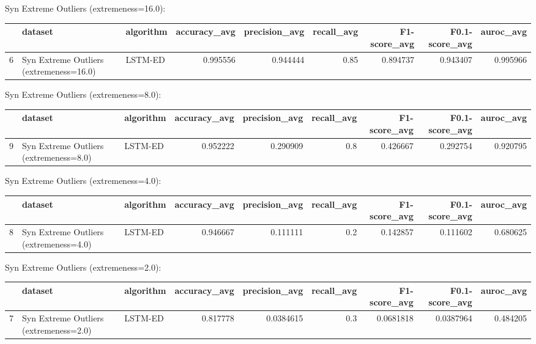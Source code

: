 Syn Extreme Outliers (extremeness=16.0):

\begin{tabular}{rllrrrrrr}
\hline
    & dataset                                 & algorithm   &   accuracy\_avg &   precision\_avg &   recall\_avg &   F1-score\_avg &   F0.1-score\_avg &   auroc\_avg \\
\hline
  6 & Syn Extreme Outliers (extremeness=16.0) & LSTM-ED     &       0.995556 &        0.944444 &         0.85 &       0.894737 &         0.943407 &    0.995966 \\
\hline
\end{tabular}

Syn Extreme Outliers (extremeness=8.0):

\begin{tabular}{rllrrrrrr}
\hline
    & dataset                                & algorithm   &   accuracy\_avg &   precision\_avg &   recall\_avg &   F1-score\_avg &   F0.1-score\_avg &   auroc\_avg \\
\hline
  9 & Syn Extreme Outliers (extremeness=8.0) & LSTM-ED     &       0.952222 &        0.290909 &          0.8 &       0.426667 &         0.292754 &    0.920795 \\
\hline
\end{tabular}

Syn Extreme Outliers (extremeness=4.0):

\begin{tabular}{rllrrrrrr}
\hline
    & dataset                                & algorithm   &   accuracy\_avg &   precision\_avg &   recall\_avg &   F1-score\_avg &   F0.1-score\_avg &   auroc\_avg \\
\hline
  8 & Syn Extreme Outliers (extremeness=4.0) & LSTM-ED     &       0.946667 &        0.111111 &          0.2 &       0.142857 &         0.111602 &    0.680625 \\
\hline
\end{tabular}

Syn Extreme Outliers (extremeness=2.0):

\begin{tabular}{rllrrrrrr}
\hline
    & dataset                                & algorithm   &   accuracy\_avg &   precision\_avg &   recall\_avg &   F1-score\_avg &   F0.1-score\_avg &   auroc\_avg \\
\hline
  7 & Syn Extreme Outliers (extremeness=2.0) & LSTM-ED     &       0.817778 &       0.0384615 &          0.3 &      0.0681818 &        0.0387964 &    0.484205 \\
\hline
\end{tabular}

